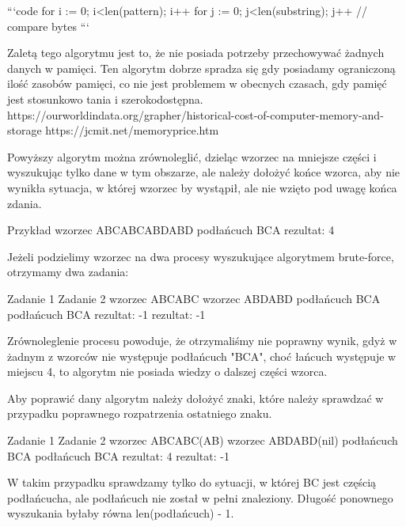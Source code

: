 ```code
for i := 0; i<len(pattern); i++{
  for j := 0; j<len(substring); j++{
    // compare bytes
  }
}
```

Zaletą tego algorytmu jest to, że nie posiada potrzeby przechowywać żadnych 
danych w pamięci. Ten algorytm dobrze spradza się gdy posiadamy ograniczoną 
ilość zasobów pamięci, co nie jest problemem w obecnych czasach, gdy pamięć jest
stosunkowo tania i szerokodostępna.
https://ourworldindata.org/grapher/historical-cost-of-computer-memory-and-storage
https://jcmit.net/memoryprice.htm

Powyższy algorytm można zrównoleglić, dzieląc wzorzec na mniejsze części
i wyszukując tylko dane w tym obszarze, ale należy dołożyć końce wzorca, aby nie
wynikła sytuacja, w której wzorzec by wystąpił, ale nie wzięto pod uwagę końca 
zdania. 

Przykład
wzorzec     ABCABCABDABD
podłańcuch  BCA
rezultat:   4

Jeżeli podzielimy wzorzec na dwa procesy wyszukujące algorytmem brute-force,
otrzymamy dwa zadania:

Zadanie 1               Zadanie 2
wzorzec     ABCABC      wzorzec     ABDABD
podłańcuch  BCA         podłańcuch  BCA
rezultat:   -1          rezultat:   -1

Zrównoleglenie procesu powoduje, że otrzymaliśmy nie poprawny wynik, gdyż w 
żadnym z wzorców nie występuje podłańcuch "BCA", choć łańcuch występuje w 
miejscu 4, to algorytm nie posiada wiedzy o dalszej części wzorca.

Aby poprawić dany algorytm należy dołożyć znaki, które należy sprawdzać w 
przypadku poprawnego rozpatrzenia ostatniego znaku.

Zadanie 1               Zadanie 2
wzorzec     ABCABC(AB)  wzorzec     ABDABD(nil)
podłańcuch  BCA         podłańcuch  BCA
rezultat:   4           rezultat:   -1

W takim przypadku sprawdzamy tylko do sytuacji, w której BC jest częścią
podłańcucha, ale podłańcuch nie został w pełni znaleziony. Długość ponownego 
wyszukania byłaby równa len(podłańcuch) - 1.

